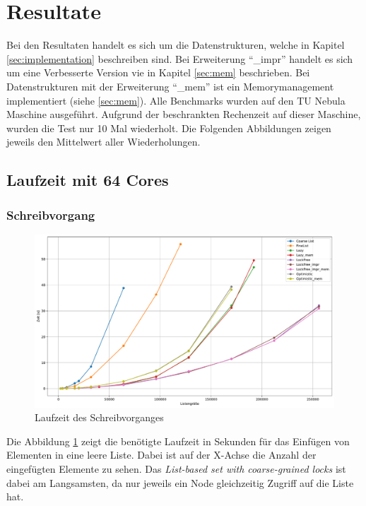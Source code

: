 \section{Resultate}
Bei den Resultaten handelt es sich um die Datenstrukturen, welche in Kapitel \ref{sec:implementation} beschreiben sind.
Bei Erweiterung ``\_impr'' handelt es sich um eine Verbesserte Version vie in Kapitel \ref{sec:mem} beschrieben.
Bei Datenstrukturen mit der Erweiterung ``\_mem'' ist ein Memorymanagement implementiert (siehe \ref{sec:mem}).
Alle Benchmarks wurden auf den TU Nebula Maschine ausgeführt. Aufgrund der beschrankten Rechenzeit auf dieser Maschine,
wurden die Test nur 10 Mal wiederholt. Die Folgenden Abbildungen zeigen jeweils den Mittelwert aller Wiederholungen.

\subsection{Laufzeit mit 64 Cores}

\subsubsection{Schreibvorgang}
\begin{figure}[ht!]
	\centering
	\includegraphics[width=1.0\linewidth]{./plots_pdf/write_time} 
	\caption{Laufzeit des Schreibvorganges}
	\label{fig:write_time} 
\end{figure}
Die Abbildung \ref{fig:write_time} zeigt die benötigte Laufzeit in Sekunden für das Einfügen von Elementen in eine leere Liste.
Dabei ist auf der X-Achse die Anzahl der eingefügten Elemente zu sehen. 
Das \textit{List-based set with coarse-grained locks} ist dabei am Langsamsten, da nur jeweils ein Node gleichzeitig 
Zugriff auf die Liste hat. 

